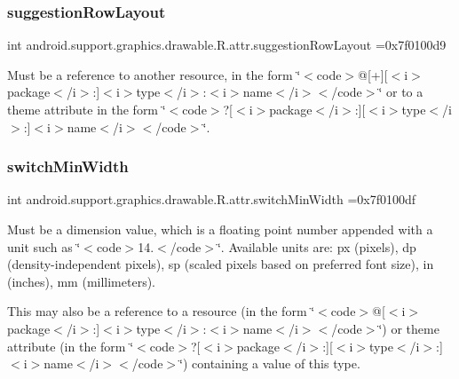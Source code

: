 \subsubsection{\texorpdfstring{suggestion\+Row\+Layout}{suggestionRowLayout}}
{\footnotesize\ttfamily int android.\+support.\+graphics.\+drawable.\+R.\+attr.\+suggestion\+Row\+Layout =0x7f0100d9\hspace{0.3cm}{\ttfamily [static]}}

Must be a reference to another resource, in the form \char`\"{}$<$code$>$@\mbox{[}+\mbox{]}\mbox{[}$<$i$>$package$<$/i$>$\+:\mbox{]}$<$i$>$type$<$/i$>$\+:$<$i$>$name$<$/i$>$$<$/code$>$\char`\"{} or to a theme attribute in the form \char`\"{}$<$code$>$?\mbox{[}$<$i$>$package$<$/i$>$\+:\mbox{]}\mbox{[}$<$i$>$type$<$/i$>$\+:\mbox{]}$<$i$>$name$<$/i$>$$<$/code$>$\char`\"{}. \mbox{\label{classandroid_1_1support_1_1graphics_1_1drawable_1_1R_1_1attr_a480c05bbe30584b8d6ab58bf3363d58e}} 
\subsubsection{\texorpdfstring{switch\+Min\+Width}{switchMinWidth}}
{\footnotesize\ttfamily int android.\+support.\+graphics.\+drawable.\+R.\+attr.\+switch\+Min\+Width =0x7f0100df\hspace{0.3cm}{\ttfamily [static]}}

Must be a dimension value, which is a floating point number appended with a unit such as \char`\"{}$<$code$>$14.\+5sp$<$/code$>$\char`\"{}. Available units are\+: px (pixels), dp (density-\/independent pixels), sp (scaled pixels based on preferred font size), in (inches), mm (millimeters). 

This may also be a reference to a resource (in the form \char`\"{}$<$code$>$@\mbox{[}$<$i$>$package$<$/i$>$\+:\mbox{]}$<$i$>$type$<$/i$>$\+:$<$i$>$name$<$/i$>$$<$/code$>$\char`\"{}) or theme attribute (in the form \char`\"{}$<$code$>$?\mbox{[}$<$i$>$package$<$/i$>$\+:\mbox{]}\mbox{[}$<$i$>$type$<$/i$>$\+:\mbox{]}$<$i$>$name$<$/i$>$$<$/code$>$\char`\"{}) containing a value of this type. \mbox{\label{classandroid_1_1support_1_1graphics_1_1drawable_1_1R_1_1attr_a342ce0aff1b96a978426819280297b6c}} 
